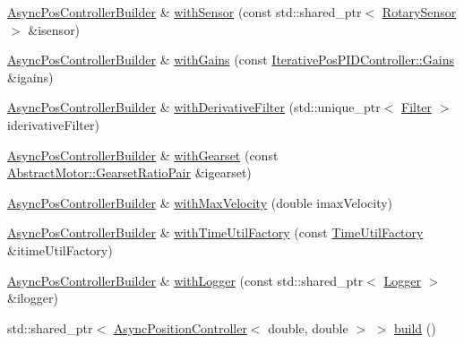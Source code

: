 \begin{DoxyCompactItemize}
\item 
\mbox{\hyperlink{classokapi_1_1AsyncPosControllerBuilder}{Async\+Pos\+Controller\+Builder}} \& \mbox{\hyperlink{classokapi_1_1AsyncPosControllerBuilder_a1e6bf12a95ebde3adc90f3d6cfaf9adc}{with\+Sensor}} (const std\+::shared\+\_\+ptr$<$ \mbox{\hyperlink{classokapi_1_1RotarySensor}{Rotary\+Sensor}} $>$ \&isensor)
\item 
\mbox{\hyperlink{classokapi_1_1AsyncPosControllerBuilder}{Async\+Pos\+Controller\+Builder}} \& \mbox{\hyperlink{classokapi_1_1AsyncPosControllerBuilder_a4ac4afe101f6e49150d5f285ccd02e50}{with\+Gains}} (const \mbox{\hyperlink{structokapi_1_1IterativePosPIDController_1_1Gains}{Iterative\+Pos\+P\+I\+D\+Controller\+::\+Gains}} \&igains)
\item 
\mbox{\hyperlink{classokapi_1_1AsyncPosControllerBuilder}{Async\+Pos\+Controller\+Builder}} \& \mbox{\hyperlink{classokapi_1_1AsyncPosControllerBuilder_a6d1bda12787e919e9b52d06703824fd1}{with\+Derivative\+Filter}} (std\+::unique\+\_\+ptr$<$ \mbox{\hyperlink{classokapi_1_1Filter}{Filter}} $>$ iderivative\+Filter)
\item 
\mbox{\hyperlink{classokapi_1_1AsyncPosControllerBuilder}{Async\+Pos\+Controller\+Builder}} \& \mbox{\hyperlink{classokapi_1_1AsyncPosControllerBuilder_a70ac24982216681b1e05a20306b2271b}{with\+Gearset}} (const \mbox{\hyperlink{structokapi_1_1AbstractMotor_1_1GearsetRatioPair}{Abstract\+Motor\+::\+Gearset\+Ratio\+Pair}} \&igearset)
\item 
\mbox{\hyperlink{classokapi_1_1AsyncPosControllerBuilder}{Async\+Pos\+Controller\+Builder}} \& \mbox{\hyperlink{classokapi_1_1AsyncPosControllerBuilder_ad95a82910616350d5519fd391143d26d}{with\+Max\+Velocity}} (double imax\+Velocity)
\item 
\mbox{\hyperlink{classokapi_1_1AsyncPosControllerBuilder}{Async\+Pos\+Controller\+Builder}} \& \mbox{\hyperlink{classokapi_1_1AsyncPosControllerBuilder_afbec86a67bab3037b2d633dc10575702}{with\+Time\+Util\+Factory}} (const \mbox{\hyperlink{classokapi_1_1TimeUtilFactory}{Time\+Util\+Factory}} \&itime\+Util\+Factory)
\item 
\mbox{\hyperlink{classokapi_1_1AsyncPosControllerBuilder}{Async\+Pos\+Controller\+Builder}} \& \mbox{\hyperlink{classokapi_1_1AsyncPosControllerBuilder_ace47053e63313f56c5646e41e5410335}{with\+Logger}} (const std\+::shared\+\_\+ptr$<$ \mbox{\hyperlink{classokapi_1_1Logger}{Logger}} $>$ \&ilogger)
\item 
std\+::shared\+\_\+ptr$<$ \mbox{\hyperlink{classokapi_1_1AsyncPositionController}{Async\+Position\+Controller}}$<$ double, double $>$ $>$ \mbox{\hyperlink{classokapi_1_1AsyncPosControllerBuilder_a15bce1f485fee03c7f1772736eea7075}{build}} ()
\end{DoxyCompactItemize}


